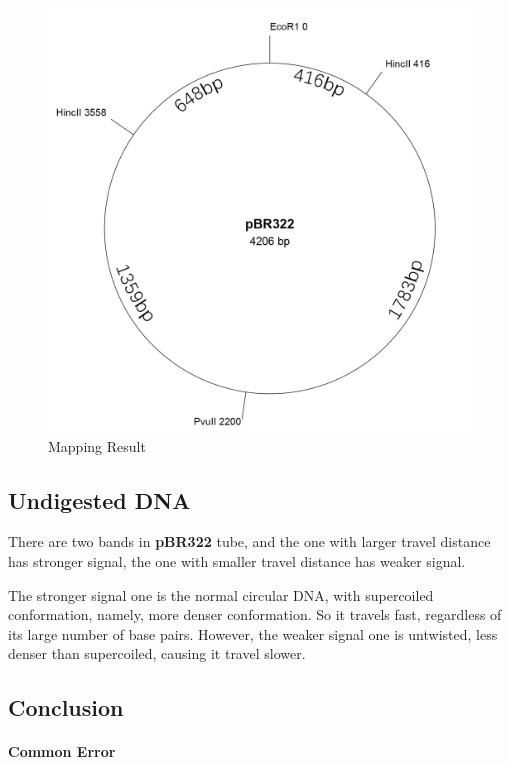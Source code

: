 \documentclass{article}
\begin{document}
            \begin{figure}[H]
                \centering
                \includegraphics[width = 0.5\linewidth]{../Data/Plasmid/final.png}
                \caption{Mapping Result}
                \label{final.map2}
            \end{figure}
        \subsection{Undigested DNA}
            There are two bands in \textbf{pBR322} tube, and the one with larger travel distance has stronger signal, the one with smaller travel distance has weaker signal. 

            The stronger signal one is the normal circular DNA, with supercoiled conformation, namely, more denser conformation. So it travels fast, regardless of its large number of base pairs. However, the weaker signal one is untwisted, less denser than supercoiled, causing it travel slower.

        \subsection{Conclusion}
            \paragraph{Common Error} 
\end{document}
